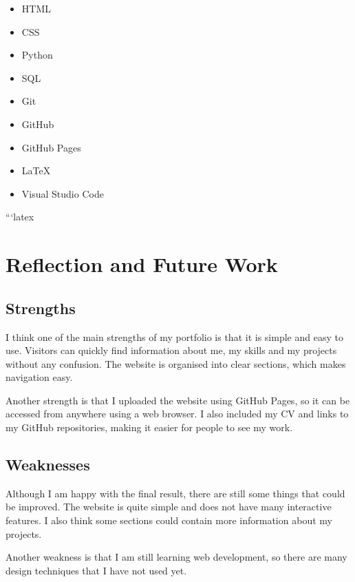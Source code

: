 \documentclass[a4paper,12pt]{article}
\begin{document}
\begin{itemize}

\item HTML

\item CSS

\item Python

\item SQL

\item Git

\item GitHub

\item GitHub Pages

\item LaTeX

\item Visual Studio Code

\end{itemize}

```latex
\section{Reflection and Future Work}

\subsection{Strengths}

I think one of the main strengths of my portfolio is that it is simple and
easy to use. Visitors can quickly find information about me, my skills and
my projects without any confusion. The website is organised into clear
sections, which makes navigation easy.

Another strength is that I uploaded the website using GitHub Pages, so it
can be accessed from anywhere using a web browser. I also included my CV
and links to my GitHub repositories, making it easier for people to see my
work.

\subsection{Weaknesses}

Although I am happy with the final result, there are still some things that
could be improved. The website is quite simple and does not have many
interactive features. I also think some sections could contain more
information about my projects.

Another weakness is that I am still learning web development, so there are
many design techniques that I have not used yet.
\end{document}

